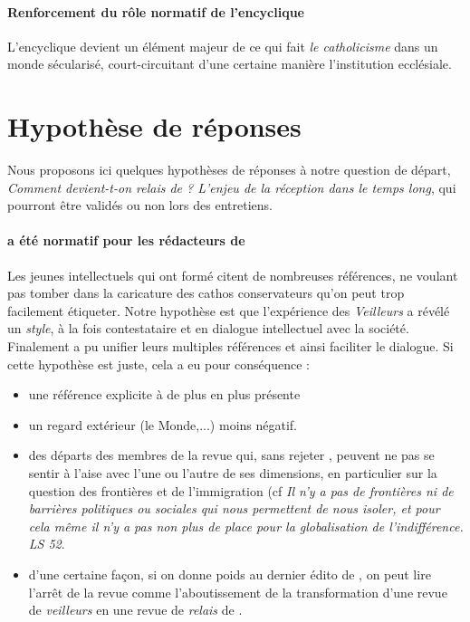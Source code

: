\paragraph{Renforcement du rôle normatif de l'encyclique} L'encyclique devient un élément majeur de ce qui fait \textit{le catholicisme} dans un monde sécularisé, court-circuitant d'une certaine manière l'institution ecclésiale. 



 


\section{Hypothèse de réponses}


Nous proposons ici quelques hypothèses de réponses à notre question de départ,  
    \textit{ Comment devient-t-on \textit{relais} de \LS ? L'enjeu de la réception dans le temps long}, qui pourront être validés ou non lors des entretiens.


\paragraph{\LS a été normatif pour les rédacteurs de \RLimite} Les jeunes intellectuels qui ont formé \RLimite citent de nombreuses références, ne voulant pas tomber dans la caricature des cathos conservateurs qu'on peut trop facilement étiqueter. Notre hypothèse est que l'expérience des \textit{Veilleurs} a révélé un \textit{style}, à la fois contestataire  et en dialogue intellectuel avec la société. Finalement \LS a pu unifier leurs multiples références et ainsi faciliter le dialogue. Si cette hypothèse est juste, cela a eu pour conséquence : 
\begin{itemize}
    \item une référence explicite à \LS de plus en plus présente 
    \item un regard extérieur (le Monde,...) moins négatif. 
    \item des départs des membres de la revue qui, sans rejeter \LS, peuvent ne pas se sentir à l'aise avec l'une ou l'autre de ses dimensions, en particulier sur la question des frontières et de l'immigration (cf \textit{Il n’y a pas de frontières ni de barrières politiques ou sociales qui nous permettent de nous isoler, et pour cela même il n’y a pas non plus de place pour la globalisation de l’indifférence. LS 52}. 
    \item d'une certaine façon, si on donne poids au dernier édito de \RLimite, on peut lire l'arrêt de la revue comme l'aboutissement de la transformation d'une revue de \textit{veilleurs} en une revue de \textit{relais} de \LS.
\end{itemize}
 
